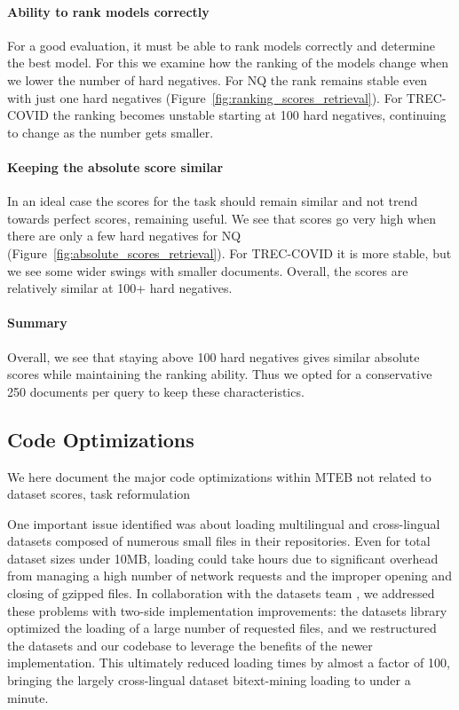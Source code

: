 \paragraph{Ability to rank models correctly} For a good evaluation, it must be able to rank models correctly and determine the best model. For this we examine how the ranking of the models change when we lower the number of hard negatives. For NQ the rank remains stable even with just one hard negatives (Figure~\ref{fig:ranking_scores_retrieval}). For TREC-COVID the ranking becomes unstable starting at 100 hard negatives, continuing to change as the number gets smaller. 

\paragraph{Keeping the absolute score similar} In an ideal case the scores for the task should remain similar and not trend towards perfect scores, remaining useful. We see that scores go very high when there are only a few hard negatives for NQ (Figure~\ref{fig:absolute_scores_retrieval}). For TREC-COVID it is more stable, but we see some wider swings with smaller documents. Overall, the scores are relatively similar at 100+ hard negatives.

\paragraph{Summary} Overall, we see that staying above 100 hard negatives gives similar absolute scores while maintaining the ranking ability. Thus we opted for a conservative 250 documents per query to keep these characteristics.



\subsection{Code Optimizations}
\label{sec:appendix-code-optimizations}

We here document the major code optimizations within MTEB not related to dataset scores, task reformulation 

One important issue identified was about loading multilingual and cross-lingual datasets composed of numerous small files in their repositories. Even for total dataset sizes under 10MB, loading could take hours due to significant overhead from managing a high number of network requests and the improper opening and closing of gzipped files. In collaboration with the datasets team \citep{datasets_paper}, we addressed these problems with two-side implementation improvements: the datasets library optimized the loading of a large number of requested files, and we restructured the datasets and our codebase to leverage the benefits of the newer implementation. This ultimately reduced loading times by almost a factor of 100, bringing the largely cross-lingual dataset bitext-mining loading to under a minute.


